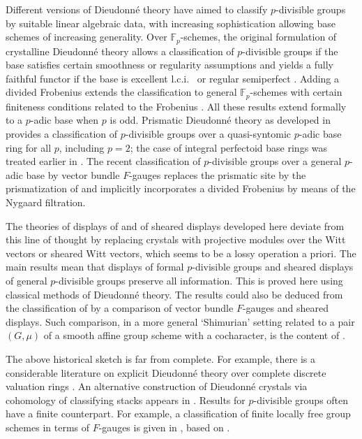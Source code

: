 \documentclass[a4paper,11pt]{amsart}
\theoremstyle{plain}
\theoremstyle{definition}
\theoremstyle{remark}
\numberwithin{equation}{section}
\newcommand{\FF}{{\mathbb{F}}}
\begin{document}
Different versions of Dieudonn\'e theory have aimed to classify $p$-divisible groups by suitable linear algebraic data, with increasing sophistication allowing base schemes of increasing generality. Over $\FF_p$-schemes, the original formulation of crystalline Dieudonn\'e theory 
\cite{Grothendieck:ICM, Grothendieck:Montreal, Messing:Crystals, Mazur-Messing, BBM} 
allows a classification of $p$-divisible groups if the base satisfies certain smoothness or regularity assumptions \cite{Berthelot-Messing, Jong:Crystalline}
and yields a fully faithful functor if the base is excellent l.c.i.\ \cite{Jong-Messing} or regular semiperfect \cite{Scholze-Weinstein:Moduli}.
Adding a divided Frobenius extends the classification to general $\FF_p$-schemes with certain finiteness conditions related to the Frobenius \cite{Lau:Semiperf, Lau:Divided}. All these results extend formally to a $p$-adic base when $p$ is odd. Prismatic Dieudonn\'e theory as developed in \cite{Anschuetz-LeBras} provides a classification of $p$-divisible groups over a quasi-syntomic $p$-adic base ring for all $p$, including $p=2$;
the case of integral perfectoid base rings was treated earlier in \cite{Scholze-Weinstein:Berkeley}. 
The recent classification of $p$-divisible groups over a general $p$-adic base by vector bundle $F$-gauges \cite{Gardner-Madapusi} replaces the prismatic site by the prismatization of \cite{Drinfeld:Prismatization, Bhatt-Lurie:Prismatization} and implicitly incorporates a divided Frobenius by means of the Nygaard filtration. 

The theories of displays of \cite{Zink:The-display} and of sheared displays developed here deviate from this line of thought by replacing crystals with projective modules over the Witt vectors or sheared Witt vectors, which seems to be a lossy operation a priori. The main results mean that displays of formal $p$-divisible groups and sheared displays of general $p$-divisible groups preserve all information. This is proved here using classical methods of Dieudonn\'e theory. The results could also be deduced from the classification of \cite{Gardner-Madapusi} by a comparison of vector bundle $F$-gauges and sheared displays. Such comparison, in a more general `Shimurian' setting related to a pair $(G,\mu)$ of 
a smooth affine group scheme with a cocharacter, is the content of \cite[Conjecture D.8.4]{Drinfeld:The-Lau}.

The above historical sketch is far from complete.
For example, there is a considerable literature on explicit Dieudonn\'e theory over complete discrete valuation rings \cite{Fontaine:Groupes, Breuil:Groupes, Kisin:Crystalline, Kim:Classification, Lau:Relations, Liu:Correspondence}. 
An alternative construction of Dieudonn\'e crystals via cohomology of  classifying stacks appears in \cite{Mondal:DieudonneI, Mondal:DieudonneII}. 
Results for $p$-divisible groups often have a finite counterpart. For example, a
classification of finite locally free group schemes in terms of $F$-gauges is given in \cite{Madapusi-Mondal}, based on \cite{Gardner-Madapusi}.
\end{document}
